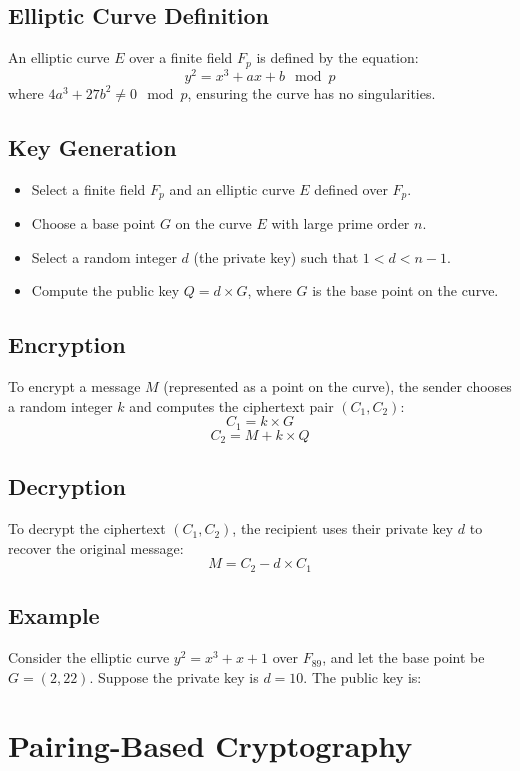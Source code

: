 \documentclass[12pt]{report}
\numberwithin{equation}{chapter}
\begin{document}
\subsection*{Elliptic Curve Definition}
An elliptic curve \( E \) over a finite field \( F_p \) is defined by the equation:
\[
y^2 = x^3 + ax + b \mod p
\]
where \( 4a^3 + 27b^2 \neq 0 \mod p \), ensuring the curve has no singularities.

\subsection*{Key Generation}
\begin{itemize}
    \item Select a finite field \( F_p \) and an elliptic curve \( E \) defined over \( F_p \).
    \item Choose a base point \( G \) on the curve \( E \) with large prime order \( n \).
    \item Select a random integer \( d \) (the private key) such that \( 1 < d < n-1 \).
    \item Compute the public key \( Q = d \times G \), where \( G \) is the base point on the curve.
\end{itemize}

\subsection*{Encryption}
To encrypt a message \( M \) (represented as a point on the curve), the sender chooses a random integer \( k \) and computes the ciphertext pair \( (C_1, C_2) \):
\[
C_1 = k \times G
\]
\[
C_2 = M + k \times Q
\]

\subsection*{Decryption}
To decrypt the ciphertext \( (C_1, C_2) \), the recipient uses their private key \( d \) to recover the original message:
\[
M = C_2 - d \times C_1
\]

\subsection*{Example}
Consider the elliptic curve \( y^2 = x^3 + x + 1 \) over \( F_{89} \), and let the base point be \( G = (2, 22) \). Suppose the private key is \( d = 10 \). The public key is:


\section{Pairing-Based Cryptography}
\end{document}
